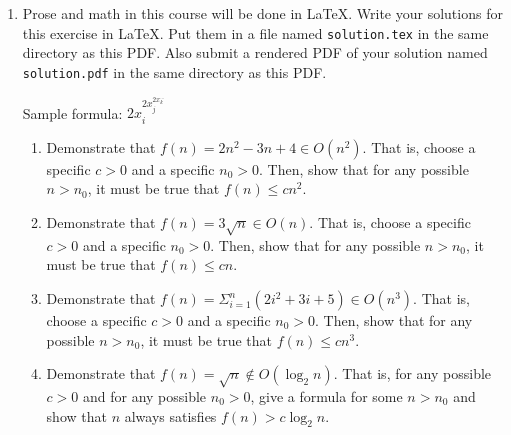 \documentclass{article}
\begin{document}
\begin{enumerate}
\pagebreak[1]
\item
  Prose and math in this course will be done in \LaTeX{}.  Write your solutions
  for this exercise in \LaTeX{}.  Put them in a file named \texttt{solution.tex}
  in the same directory as this PDF.  Also submit a rendered PDF of your
  solution named \texttt{solution.pdf} in the same directory as this PDF.

  Sample formula:
  \( 2x_i^{2x_j^{2x_k^{\dots}}} \)

  \begin{enumerate}

  \item Demonstrate that
    \(f(n) = 2n^2 - 3n + 4 \in O(n^2)\).
    That is, choose a specific \(c>0\) and a specific \(n_0 > 0\).
    Then, show that for any possible \(n > n_0\), it must be true that
    \(f(n) \leq c n^2\).

  \item Demonstrate that
    \(f(n) = 3 \sqrt{n} \in O(n)\).
    That is, choose a specific \(c>0\) and a specific \(n_0 > 0\).
    Then, show that for any possible \(n > n_0\), it must be true that
    \(f(n) \leq c n\).

  \item Demonstrate that
    \(f(n) = \Sigma_{i=1}^{n} (2i^2+3i+5) \in O(n^3)\).
    That is, choose a specific \(c>0\) and a specific \(n_0 > 0\).
    Then, show that for any possible \(n > n_0\), it must be true that
    \(f(n) \leq c n^3\).

  \item Demonstrate that
    \(f(n) = \sqrt{n} \not\in O(\log_2 n)\).
    That is, for any possible \(c>0\) and for any possible \(n_0 > 0\), give a
    formula for some \(n > n_0\) and show that \(n\) always satisfies
    \(f(n) > c \log_2 n\).

  \end{enumerate}

\end{enumerate}
\end{document}
